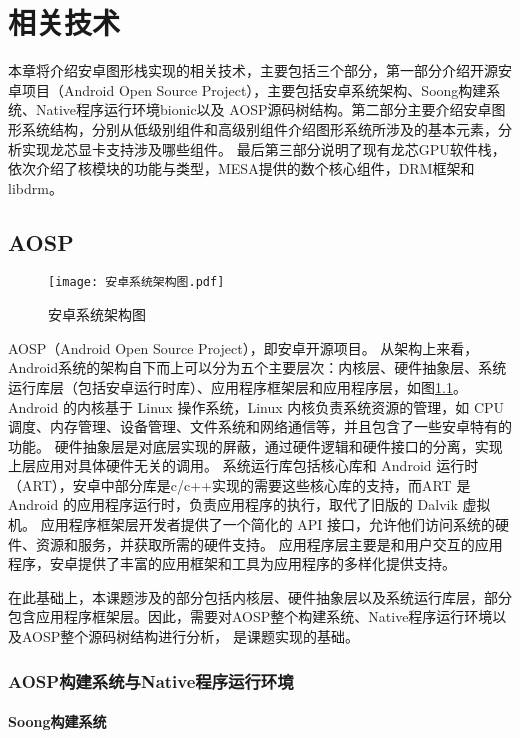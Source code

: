 
\chapter{相关技术}
本章将介绍安卓图形栈实现的相关技术，主要包括三个部分，第一部分介绍开源安卓项目（Android Open Source Project），主要包括安卓系统架构、Soong构建系统、Native程序运行环境bionic以及
AOSP源码树结构。第二部分主要介绍安卓图形系统结构，分别从低级别组件和高级别组件介绍图形系统所涉及的基本元素，分析实现龙芯显卡支持涉及哪些组件。
最后第三部分说明了现有龙芯GPU软件栈，依次介绍了核模块的功能与类型，MESA提供的数个核心组件，DRM框架和libdrm。

\section{AOSP}

\begin{figure}[h]
  \centering
  \texttt{[image: 安卓系统架构图.pdf]}
  \caption{安卓系统架构图}
  \label{fig:安卓系统架构图}
\end{figure}

AOSP（Android Open Source Project），即安卓开源项目。
从架构上来看，Android系统的架构自下而上可以分为五个主要层次：内核层、硬件抽象层、系统运行库层（包括安卓运行时库）、应用程序框架层和应用程序层，如图\ref{fig:安卓系统架构图}。
Android 的内核基于 Linux 操作系统，Linux 内核负责系统资源的管理，如 CPU 调度、内存管理、设备管理、文件系统和网络通信等，并且包含了一些安卓特有的功能。
硬件抽象层是对底层实现的屏蔽，通过硬件逻辑和硬件接口的分离，实现上层应用对具体硬件无关的调用。
系统运行库包括核心库和 Android 运行时（ART），安卓中部分库是c/c++实现的需要这些核心库的支持，而ART 是 Android 的应用程序运行时，负责应用程序的执行，取代了旧版的 Dalvik 虚拟机。
应用程序框架层开发者提供了一个简化的 API 接口，允许他们访问系统的硬件、资源和服务，并获取所需的硬件支持。
应用程序层主要是和用户交互的应用程序，安卓提供了丰富的应用框架和工具为应用程序的多样化提供支持。

在此基础上，本课题涉及的部分包括内核层、硬件抽象层以及系统运行库层，部分包含应用程序框架层。因此，需要对AOSP整个构建系统、Native程序运行环境以及AOSP整个源码树结构进行分析，
是课题实现的基础。

\subsection{AOSP构建系统与Native程序运行环境}

\subsubsection{Soong构建系统}

